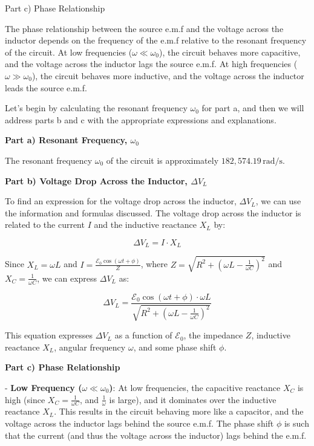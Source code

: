 Part c) Phase Relationship

The phase relationship between the source e.m.f and the voltage across the inductor depends on the frequency of the e.m.f relative to the resonant frequency of the circuit. At low frequencies (\(\omega \ll \omega_{0}\)), the circuit behaves more capacitive, and the voltage across the inductor lags the source e.m.f. At high frequencies (\(\omega \gg \omega_{0}\)), the circuit behaves more inductive, and the voltage across the inductor leads the source e.m.f.

Let's begin by calculating the resonant frequency \(\omega_{0}\) for part a, and then we will address parts b and c with the appropriate expressions and explanations.

\textbf{Part a) Resonant Frequency, \( \omega_{0} \)}

The resonant frequency \(\omega_{0}\) of the circuit is approximately \(182,574.19 \, \text{rad/s}\).

\textbf{Part b) Voltage Drop Across the Inductor, \( \Delta V_{L} \)}

To find an expression for the voltage drop across the inductor, \( \Delta V_{L} \), we can use the information and formulas discussed. The voltage drop across the inductor is related to the current \(I\) and the inductive reactance \(X_{L}\) by:

\[ \Delta V_{L} = I \cdot X_{L} \]

Since \(X_{L} = \omega L\) and \(I = \frac{\mathcal{E}_{0} \cos(\omega t + \phi)}{Z}\), where \(Z = \sqrt{R^2 + (\omega L - \frac{1}{\omega C})^2}\) and \(X_{C} = \frac{1}{\omega C}\), we can express \( \Delta V_{L} \) as:

\[ \Delta V_{L} = \frac{\mathcal{E}_{0} \cos(\omega t + \phi) \cdot \omega L}{\sqrt{R^2 + (\omega L - \frac{1}{\omega C})^2}} \]

This equation expresses \( \Delta V_{L} \) as a function of \(\mathcal{E}_{0}\), the impedance \(Z\), inductive reactance \(X_{L}\), angular frequency \(\omega\), and some phase shift \(\phi\).

\textbf{Part c) Phase Relationship}

- \textbf{Low Frequency (\(\omega \ll \omega_{0}\))}: At low frequencies, the capacitive reactance \(X_{C}\) is high (since \(X_{C} = \frac{1}{\omega C}\), and \(\frac{1}{\omega}\) is large), and it dominates over the inductive reactance \(X_{L}\). This results in the circuit behaving more like a capacitor, and the voltage across the inductor lags behind the source e.m.f. The phase shift \(\phi\) is such that the current (and thus the voltage across the inductor) lags behind the e.m.f.

